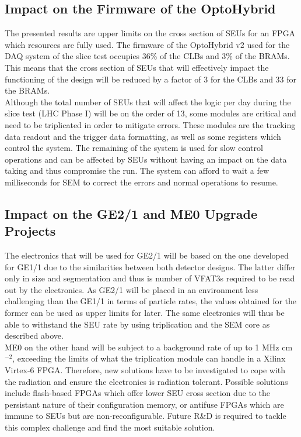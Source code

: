     \subsection{Impact on the Firmware of the OptoHybrid}

      The presented results are upper limits on the cross section of SEUs for an FPGA which resources are fully used. The firmware of the OptoHybrid v2 used for the DAQ system of the slice test occupies 36\% of the CLBs and 3\% of the BRAMs. This means that the cross section of SEUs that will effectively impact the functioning of the design will be reduced by a factor of 3 for the CLBs and 33 for the BRAMs. \\

      Although the total number of SEUs that will affect the logic per day during the slice test (LHC Phase I) will be on the order of 13, some modules are critical and need to be triplicated in order to mitigate errors. These modules are the tracking data readout and the trigger data formatting, as well as some registers which control the system. The remaining of the system is used for slow control operations and can be affected by SEUs without having an impact on the data taking and thus compromise the run. The system can afford to wait a few milliseconds for SEM to correct the errors and normal operations to resume.

    \subsection{Impact on the GE2/1 and ME0 Upgrade Projects}

      The electronics that will be used for GE2/1 will be based on the one developed for GE1/1 due to the similarities between both detector designs. The latter differ only in size and segmentation and thus is number of VFAT3s required to be read out by the electronics. As GE2/1 will be placed in an environment less challenging than the GE1/1 in terms of particle rates, the values obtained for the former can be used as upper limits for later. The same electronics will thus be able to withstand the SEU rate by using triplication and the SEM core as described above. \\

      ME0 on the other hand will be subject to a background rate of up to 1 MHz cm$^{-2}$, exceeding the limits of what the triplication module can handle in a Xilinx Virtex-6 FPGA. Therefore, new solutions have to be investigated to cope with the radiation and ensure the electronics is radiation tolerant. Possible solutions include flash-based FPGAs which offer lower SEU cross section due to the persistant nature of their configuration memory, or antifuse FPGAs which are immune to SEUs but are non-reconfigurable. Future R\&D is required to tackle this complex challenge and find the most suitable solution.

